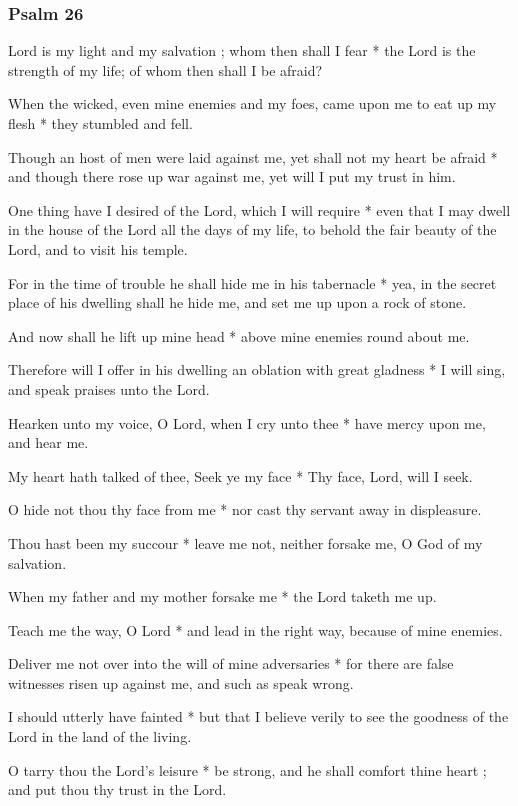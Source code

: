 \subsubsection{Psalm 26}


 Lord is my light and my salvation ; whom then shall I fear * the Lord is the strength of my life; of whom then shall I be afraid?

When the wicked, even mine enemies and my foes, came upon me to eat up my flesh * they stumbled and fell.

Though an host of men were laid against me, yet shall not my heart be afraid * and though there rose up war against me, yet will I put my trust in him.

One thing have I desired of the Lord, which I will require * even that I may dwell in the house of the Lord all the days of my life, to behold the fair beauty of the Lord, and to visit his temple.

For in the time of trouble he shall hide me in his tabernacle * yea, in the secret place of his dwelling shall he hide me, and set me up upon a rock of stone.

And now shall he lift up mine head * above mine enemies round about me.

Therefore will I offer in his dwelling an oblation with great gladness * I will sing, and speak praises unto the Lord.

Hearken unto my voice, O Lord, when I cry unto thee * have mercy upon me, and hear me.

My heart hath talked of thee, Seek ye my face * Thy face, Lord, will I seek.

O hide not thou thy face from me * nor cast thy servant away in displeasure.

Thou hast been my succour * leave me not, neither forsake me, O God of my salvation.

When my father and my mother forsake me * the Lord taketh me up.

Teach me the way, O Lord * and lead in the right way, because of mine enemies.

Deliver me not over into the will of mine adversaries * for there are false witnesses risen up against me, and such as speak wrong.

I should utterly have fainted * but that I believe verily to see the goodness of the Lord in the land of the living.

O tarry thou the Lord's leisure * be strong, and he shall comfort thine heart ; and put thou thy trust in the Lord.

